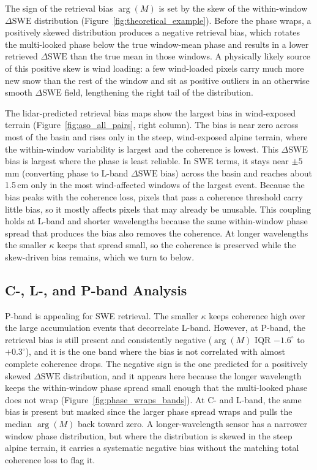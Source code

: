 \documentclass[tc, manuscript]{copernicus}
\begin{document}
The sign of the retrieval bias $\arg(M)$ is set by the skew of the within-window $\Delta\mathrm{SWE}$ distribution (Figure~\ref{fig:theoretical_example}). Before the phase wraps, a positively skewed distribution produces a negative retrieval bias, which rotates the multi-looked phase below the true window-mean phase and results in a lower retrieved $\Delta\mathrm{SWE}$ than the true mean in those windows. A physically likely source of this positive skew is wind loading: a few wind-loaded pixels carry much more new snow than the rest of the window and sit as positive outliers in an otherwise smooth $\Delta\mathrm{SWE}$ field, lengthening the right tail of the distribution.

The lidar-predicted retrieval bias maps show the largest bias in wind-exposed terrain (Figure~\ref{fig:aso_all_pairs}, right column). The bias is near zero across most of the basin and rises only in the steep, wind-exposed alpine terrain, where the within-window variability is largest and the coherence is lowest. This $\Delta\mathrm{SWE}$ bias is largest where the phase is least reliable. In SWE terms, it stays near $\pm5$\,\unit{mm} (converting phase to L-band $\Delta\mathrm{SWE}$ bias) across the basin and reaches about 1.5\,\unit{cm} only in the most wind-affected windows of the largest event. Because the bias peaks with the coherence loss, pixels that pass a coherence threshold carry little bias, so it mostly affects pixels that may already be unusable. This coupling holds at L-band and shorter wavelengths because the same within-window phase spread that produces the bias also removes the coherence. At longer wavelengths the smaller $\kappa$ keeps that spread small, so the coherence is preserved while the skew-driven bias remains, which we turn to below.

\subsection{C-, L-, and P-band Analysis}\label{subsec:band-analysis}

P-band is appealing for SWE retrieval. The smaller $\kappa$ keeps coherence high over the large accumulation events that decorrelate L-band. However, at P-band, the retrieval bias is still present and consistently negative ($\arg(M)$ IQR $-1.6^\circ$ to $+0.3^\circ$), and it is the one band where the bias is not correlated with almost complete coherence drops. The negative sign is the one predicted for a positively skewed $\Delta\mathrm{SWE}$ distribution, and it appears here because the longer wavelength keeps the within-window phase spread small enough that the multi-looked phase does not wrap (Figure~\ref{fig:phase_wraps_bands}). At C- and L-band, the same bias is present but masked since the larger phase spread wraps and pulls the median $\arg(M)$ back toward zero. A longer-wavelength sensor has a narrower window phase distribution, but where the distribution is skewed in the steep alpine terrain, it carries a systematic negative bias without the matching total coherence loss to flag it.
\end{document}
